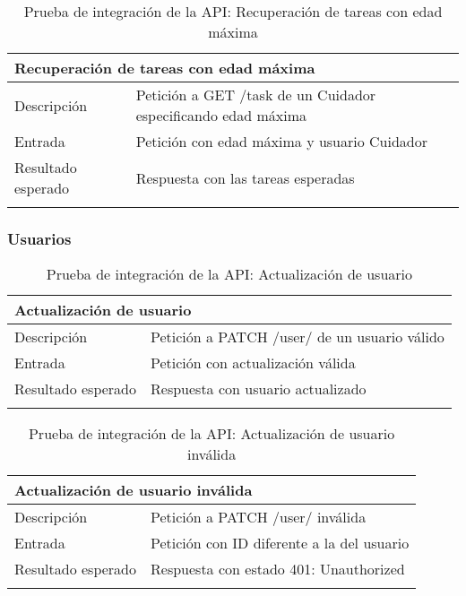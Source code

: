 \begin{longtable}{|p{} p{}|}
    \hline
    \multicolumn{2}{|l|}{\textbf{Recuperación de tareas con edad máxima}} \\ \hline 
    Descripción                 & Petición a GET /task de un Cuidador especificando edad máxima \\ \hline
    Entrada                     & Petición con edad máxima y usuario Cuidador\\  \hline
    Resultado esperado          & Respuesta con las tareas esperadas \\ \hline
    \caption{Prueba de integración de la API: Recuperación de tareas con edad máxima}
    \label{cp:i:api:recuperacion_tareas_edad_maxima}
\end{longtable}

\vspace{-15pt}
\subsubsection{Usuarios}

\begin{longtable}{|p{} p{}|}
    \hline
    \multicolumn{2}{|l|}{\textbf{Actualización de usuario}} \\ \hline 
    Descripción                 & Petición a PATCH /user/ de un usuario válido \\ \hline
    Entrada                     & Petición con actualización válida \\  \hline
    Resultado esperado          & Respuesta con usuario actualizado \\ \hline
    \caption{Prueba de integración de la API: Actualización de usuario}
    \label{cp:i:api:actualizacion_usuario}
\end{longtable}

\begin{longtable}{|p{} p{}|}
    \hline
    \multicolumn{2}{|l|}{\textbf{Actualización de usuario inválida}} \\ \hline 
    Descripción                 & Petición a PATCH /user/ inválida \\ \hline
    Entrada                     & Petición con ID diferente a la del usuario \\  \hline
    Resultado esperado          & Respuesta con estado 401: Unauthorized \\ \hline
    \caption{Prueba de integración de la API: Actualización de usuario inválida}
    \label{cp:i:api:actualizacion_usuario_invalida}
\end{longtable}

